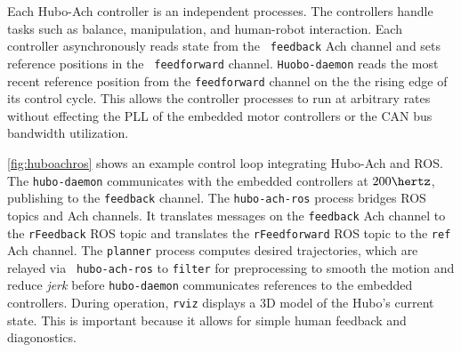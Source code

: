 

Each Hubo-Ach controller is an independent processes.  The controllers
handle tasks such as balance, manipulation, and human-robot
interaction.  Each controller asynchronously reads state from the {\tt
  feedback} Ach channel and sets reference positions in the {\tt
  feedforward} channel.  {\tt Huobo-daemon} reads the most recent
reference position from the {\tt feedforward} channel on the the
rising edge of its control cycle.  This allows the controller
processes to run at arbitrary rates without effecting the PLL of the
embedded motor controllers or the CAN bus bandwidth utilization.




\autoref{fig:huboachros} shows an example control loop integrating
Hubo-Ach and ROS.  The {\tt hubo-daemon} communicates with the
embedded controllers at $200 \hertz$, publishing to the {\tt feedback}
channel.  The {\tt hubo-ach-ros} process bridges ROS topics and Ach
channels.  It translates messages on the {\tt feedback} Ach channel to
the {\tt rFeedback} ROS topic and translates the {\tt rFeedforward}
ROS topic to the {\tt ref} Ach channel.  The {\tt planner} process
computes desired trajectories, which are relayed via {\tt
  hubo-ach-ros} to {\tt filter} for preprocessing to smooth the motion
and reduce \emph{jerk} before {\tt hubo-daemon} communicates
references to the embedded controllers.  During operation, {\tt rviz}
displays a 3D model of the Hubo's current state.  
This is important because it allows for simple human feedback and diagonostics.

